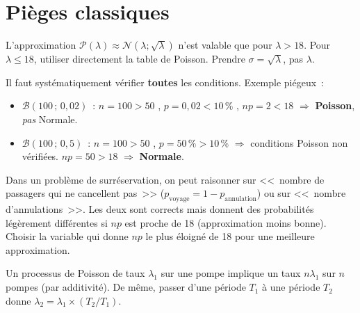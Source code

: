 \documentclass[11pt,a4paper]{article}
\begin{document}
\section{Pi\`eges classiques}

\begin{alertbox}
L'approximation $\mathcal{P}(\lambda) \approx \mathcal{N}(\lambda;\sqrt{\lambda})$ n'est valable que pour $\lambda > 18$. Pour $\lambda \leq 18$, utiliser directement la table de Poisson. Prendre $\sigma = \sqrt{\lambda}$, pas $\lambda$.
\end{alertbox}

\begin{alertbox}
Il faut syst\'ematiquement v\'erifier \textbf{toutes} les conditions. Exemple pi\'egeux~:
\begin{itemize}
  \item $\mathcal{B}(100\,;\,0{,}02)$~: $n=100>50$ \checkmark, $p=0{,}02<10\,\%$ \checkmark, $np=2<18$ \checkmark $\Rightarrow$ \textbf{Poisson}, \emph{pas} Normale.
  \item $\mathcal{B}(100\,;\,0{,}5)$~: $n=100>50$ \checkmark, $p=50\,\%>10\,\%$ $\Rightarrow$ conditions Poisson non v\'erifi\'ees. $np=50>18$ \checkmark $\Rightarrow$ \textbf{Normale}.
\end{itemize}
\end{alertbox}

\begin{alertbox}
Dans un probl\`eme de surr\'eservation, on peut raisonner sur <<~{}nombre de passagers qui ne cancellent pas~>> ($p_{\text{voyage}} = 1 - p_{\text{annulation}}$) ou sur <<~{}nombre d'annulations~>>. Les deux sont corrects mais donnent des probabilit\'es l\'eg\`erement diff\'erentes si $np$ est proche de 18 (approximation moins bonne). Choisir la variable qui donne $np$ le plus \'eloign\'e de 18 pour une meilleure approximation.
\end{alertbox}

\begin{alertbox}
Un processus de Poisson de taux $\lambda_1$ sur une pompe implique un taux $n\lambda_1$ sur $n$ pompes (par additivit\'e). De m\^eme, passer d'une p\'eriode $T_1$ \`a une p\'eriode $T_2$ donne $\lambda_2 = \lambda_1 \times (T_2/T_1)$.
\end{alertbox}
\end{document}
